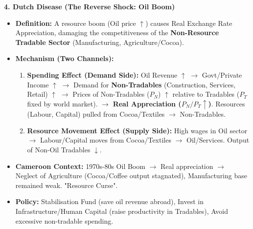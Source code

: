 \documentclass[11pt]{article}
\begin{document}
\begin{exoresolu}
\textbf{4. Dutch Disease (The Reverse Shock: Oil Boom)}
\begin{itemize}
    \item \textbf{Definition:} A resource boom (Oil price $\uparrow$) causes Real Exchange Rate Appreciation, damaging the competitiveness of the \textbf{Non-Resource Tradable Sector} (Manufacturing, Agriculture/Cocoa).
    \item \textbf{Mechanism (Two Channels):}
        \begin{enumerate}
            \item \textbf{Spending Effect (Demand Side):} Oil Revenue $\uparrow$ $\rightarrow$ Govt/Private Income $\uparrow$ $\rightarrow$ Demand for \textbf{Non-Tradables} (Construction, Services, Retail) $\uparrow$ $\rightarrow$ Prices of Non-Tradables ($P_N$) $\uparrow$ relative to Tradables ($P_T$ fixed by world market). $\rightarrow$ \textbf{Real Appreciation ($P_N/P_T \uparrow$)}. Resources (Labour, Capital) pulled from Cocoa/Textiles $\rightarrow$ Non-Tradables.
            \item \textbf{Resource Movement Effect (Supply Side):} High wages in Oil sector $\rightarrow$ Labour/Capital moves from Cocoa/Textiles $\rightarrow$ Oil/Services. Output of Non-Oil Tradables $\downarrow$.
        \end{enumerate}
    \item \textbf{Cameroon Context:} 1970s-80s Oil Boom $\rightarrow$ Real appreciation $\rightarrow$ Neglect of Agriculture (Cocoa/Coffee output stagnated), Manufacturing base remained weak. "Resource Curse".
    \item \textbf{Policy:} Stabilisation Fund (save oil revenue abroad), Invest in Infrastructure/Human Capital (raise productivity in Tradables), Avoid excessive non-tradable spending.
\end{itemize}
\end{exoresolu}
\end{document}
